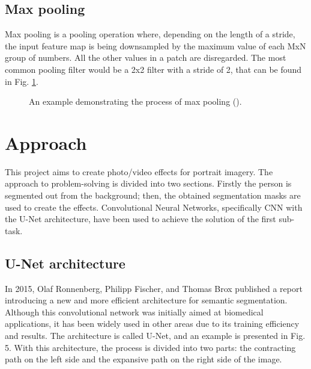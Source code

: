 \documentclass[english]{sbrt}
\begin{document}
\subsection{Max pooling}
Max pooling is a pooling operation where, depending on the length of a stride, the input feature map is being downsampled by the maximum value of each MxN group of numbers. All the other values in a patch are disregarded. The most common pooling filter would be a 2x2 filter with a stride of 2, that can be found in Fig. \ref{fig:fig4}.

\begin{figure}[H]
\centering 
{}
\caption{\label{fig:fig4} An example demonstrating the process of max pooling  (\cite{gupta_2018_deep}).}
\end{figure}


\section{Approach}
This project aims to create photo/video effects for portrait imagery. The approach to problem-solving is divided into two sections. Firstly the person is segmented out from the background; then, the obtained segmentation masks are used to create the effects. 
Convolutional Neural Networks, specifically CNN with the U-Net architecture, have been used to achieve the solution of the first sub-task.

\subsection{U-Net architecture}
In 2015, Olaf Ronnenberg, Philipp Fischer, and Thomas Brox published a report introducing a new and more efficient architecture for semantic segmentation. Although this convolutional network was initially aimed at biomedical applications, it has been widely used in other areas due to its training efficiency and results. 
The architecture is called U-Net, and an example is presented in Fig. 5. With this architecture, the process is divided into two parts: the contracting path on the left side and the expansive path on the right side of the image.
\end{document}

